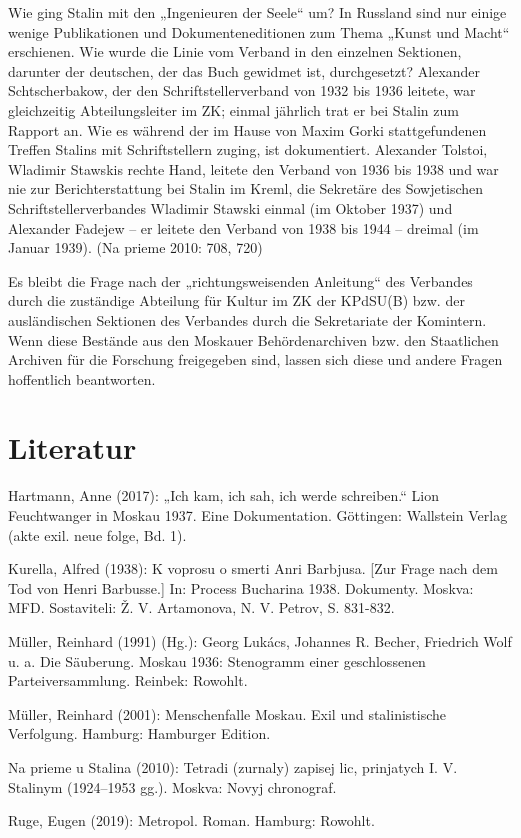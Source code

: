 \begin{multicols*}{2}
Wie ging Stalin mit den „Ingenieuren der Seele“ um? In Russland sind nur einige wenige Publikationen und Dokumenteneditionen zum Thema „Kunst und Macht“ erschienen. Wie wurde die Linie vom Verband in den einzelnen Sektionen, darunter der deutschen, der das Buch gewidmet ist, durchgesetzt? Alexander Schtscherbakow, der den Schriftstellerverband von 1932 bis 1936 leitete, war gleichzeitig Abteilungsleiter im ZK; einmal jährlich trat er bei Stalin zum Rapport an. Wie es während der im Hause von Maxim Gorki stattgefundenen Treffen Stalins mit Schriftstellern zuging, ist dokumentiert. Alexander Tolstoi, Wladimir Stawskis rechte Hand, leitete den Verband von 1936 bis 1938 und war nie zur Berichterstattung bei Stalin im Kreml, die Sekretäre des Sowjetischen Schriftstellerverbandes Wladimir Stawski einmal (im Oktober 1937) und Alexander Fadejew – er leitete den Verband von 1938 bis 1944 – dreimal (im Januar 1939). (Na prieme 2010: 708, 720)

Es bleibt die Frage nach der „richtungsweisenden Anleitung“ des Verbandes durch die zuständige Abteilung für Kultur im ZK der KPdSU(B) bzw. der ausländischen Sektionen des Verbandes durch die Sekretariate der Komintern. Wenn diese Bestände aus den Moskauer Behördenarchiven bzw. den Staatlichen Archiven für die Forschung freigegeben sind, lassen sich diese und andere Fragen hoffentlich beantworten.\\\bigskip



\section{Literatur}
\begin{bibdescription}
    \item Hartmann, Anne (2017): „Ich kam, ich sah, ich werde schreiben.“ Lion Feuchtwanger in Moskau 1937. Eine Dokumentation. Göttingen: Wallstein Verlag (akte exil. neue folge, Bd. 1). 
    \item Kurella, Alfred (1938): K voprosu o smerti Anri Barbjusa. [Zur Frage nach dem Tod von Henri Barbusse.] In: Process Bucharina 1938. Dokumenty. Moskva: MFD. Sostaviteli: Ž. V. Artamonova, N. V. Petrov, S. 831-832.
    \item Müller, Reinhard (1991) (Hg.): Georg Lukács, Johannes R. Becher, Friedrich Wolf u. a. Die Säuberung. Moskau 1936: Stenogramm einer geschlossenen Parteiversammlung. Reinbek: Rowohlt.
    \item Müller, Reinhard (2001): Menschenfalle Moskau. Exil und stalinistische Verfolgung. Hamburg: Hamburger Edition.
    \item Na prieme u Stalina (2010): Tetradi (zurnaly) zapisej lic, prinjatych I. V. Stalinym (1924–1953 gg.). Moskva: Novyj chronograf.
    \item Ruge, Eugen (2019): Metropol. Roman. Hamburg: Rowohlt.
\end{bibdescription}


\end{multicols*}
